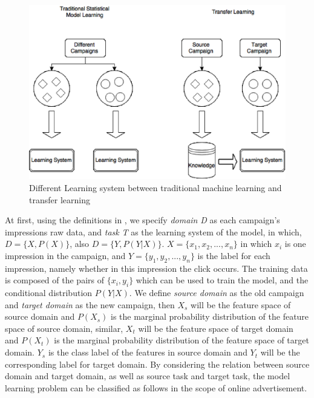 \documentclass{sig-alternate}
\begin{document}
\begin{figure}[t]
\centering
\includegraphics[width=\columnwidth]{transferlearning.eps}
\caption{Different Learning system between traditional machine learning and transfer learning}
\label{fig:transfer}
\end{figure}

At first, using the definitions in \cite{pan2010survey}, we specify \textit{domain} \textit{D} as each campaign's impressions raw data, and \textit{task} \textit{T} as the learning system of the model, in which, \(D = \{X,P(X)\}\), also  \(D = \{Y,P(Y|X)\}\). \(X = \{x_1,x_2, ..., x_n\}\) in which \(x_i\) is one impression in the campaign, and \(Y = \{y_1,y_2, ..., y_n\}\) is the label for each impression, namely whether in this impression the click occurs. The training data is composed of the pairs of \(\{x_i,y_i\}\) which can be used to train the model, and the conditional distribution \(P(Y|X)\). We define \textit{source domain} as the old campaign and \textit{target domain} as the new campaign, then \(X_s\) will be the feature space of source domain and \(P(X_s)\) is the marginal probability distribution of the feature space of source domain, similar, \(X_t\) will be the feature space of target domain and \(P(X_t)\) is the marginal probability distribution of the feature space of target domain. \(Y_s\) is the class label of the features in source domain and \(Y_t\) will be the corresponding label for target domain. By considering the relation between source domain and target domain, as well as source task and target task, the model learning problem can be classified as follows in the scope of online advertisement. 
\end{document}
